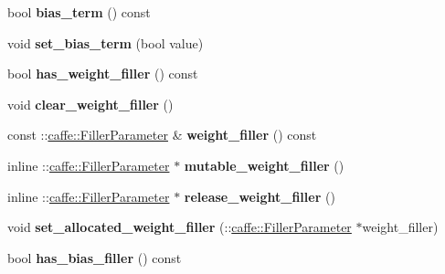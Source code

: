 \begin{DoxyCompactItemize}
bool {\bfseries bias\+\_\+term} () const
\item 
\mbox{\label{classcaffe_1_1_inner_product_parameter_a810d02ecd24b233ffd8df7afdc8f892b}} 
void {\bfseries set\+\_\+bias\+\_\+term} (bool value)
\item 
\mbox{\label{classcaffe_1_1_inner_product_parameter_a9240ff70e346ce17d1f1be1a0ebfd4b0}} 
bool {\bfseries has\+\_\+weight\+\_\+filler} () const
\item 
\mbox{\label{classcaffe_1_1_inner_product_parameter_a3c1e0859395e9b406a203148ab409a6b}} 
void {\bfseries clear\+\_\+weight\+\_\+filler} ()
\item 
\mbox{\label{classcaffe_1_1_inner_product_parameter_a45ff804d5e846acfb6b839a31fe80bae}} 
const \+::\mbox{\hyperlink{classcaffe_1_1_filler_parameter}{caffe\+::\+Filler\+Parameter}} \& {\bfseries weight\+\_\+filler} () const
\item 
\mbox{\label{classcaffe_1_1_inner_product_parameter_a50118c1652fe3ba411ffce710506482c}} 
inline \+::\mbox{\hyperlink{classcaffe_1_1_filler_parameter}{caffe\+::\+Filler\+Parameter}} $\ast$ {\bfseries mutable\+\_\+weight\+\_\+filler} ()
\item 
\mbox{\label{classcaffe_1_1_inner_product_parameter_a355b195ca4fed91fffb71c65fa1a382e}} 
inline \+::\mbox{\hyperlink{classcaffe_1_1_filler_parameter}{caffe\+::\+Filler\+Parameter}} $\ast$ {\bfseries release\+\_\+weight\+\_\+filler} ()
\item 
\mbox{\label{classcaffe_1_1_inner_product_parameter_adefb969403f950ed9533efcc2f7a0de8}} 
void {\bfseries set\+\_\+allocated\+\_\+weight\+\_\+filler} (\+::\mbox{\hyperlink{classcaffe_1_1_filler_parameter}{caffe\+::\+Filler\+Parameter}} $\ast$weight\+\_\+filler)
\item 
\mbox{\label{classcaffe_1_1_inner_product_parameter_a51faebf52b95be30f7df6a378c0210bf}} 
bool {\bfseries has\+\_\+bias\+\_\+filler} () const

\end{DoxyCompactItemize}

